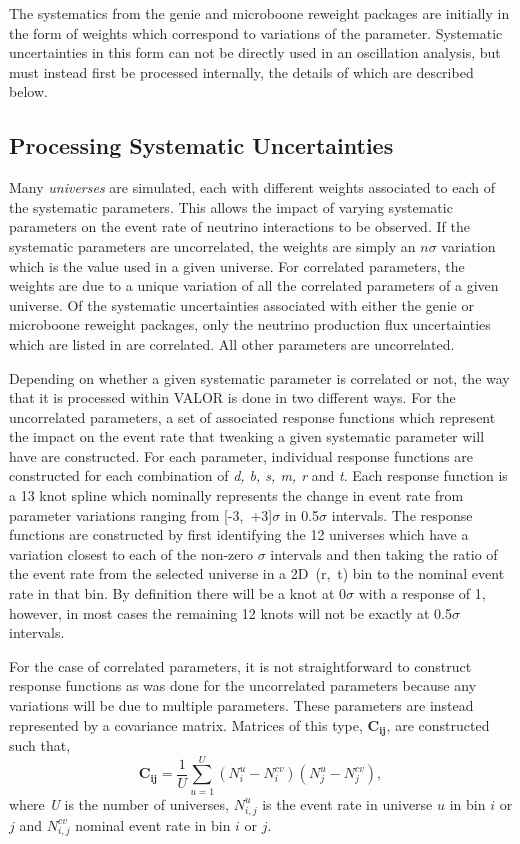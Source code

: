 The systematics from the \gls{genie} and \gls{microboone} reweight packages are initially in the form of weights which correspond to variations of the parameter. Systematic uncertainties in this form can not be directly used in an oscillation analysis, but must instead first be processed internally, the details of which are described below.

\subsection{Processing Systematic Uncertainties}\label{sec:systematic_validation}

Many \textit{universes} are simulated, each with different weights associated to each of the systematic parameters. This allows the impact of varying systematic parameters on the event rate of neutrino interactions to be observed. If the systematic parameters are uncorrelated, the weights are simply an $n \sigma$ variation which is the value used in a given universe. For correlated parameters, the weights are due to a unique variation of all the correlated parameters of a given universe. Of the systematic uncertainties associated with either the \gls{genie} or \gls{microboone} reweight packages, only the neutrino production flux uncertainties which are listed in  are correlated. All other parameters are uncorrelated. 

Depending on whether a given systematic parameter is correlated or not, the way that it is processed within VALOR is done in two different ways. For the uncorrelated parameters, a set of associated response functions which represent the impact on the event rate that tweaking a given systematic parameter will have are constructed. For each parameter, individual response functions are constructed for each combination of \textit{d, b, s, m, r} and \textit{t}. Each response function is a 13 knot spline which nominally represents the change in event rate from parameter variations ranging from \mbox{[-3, +3]$\sigma$} in 0.5$\sigma$ intervals. The response functions are constructed by first identifying the 12 universes which have a variation closest to each of the non-zero $\sigma$ intervals and then taking the ratio of the event rate from the selected universe in a \mbox{2D (r, t)} bin to the nominal event rate in that bin. By definition there will be a knot at 0$\sigma$ with a response of 1, however, in most cases the remaining 12 knots will not be exactly at 0.5$\sigma$ intervals. 

For the case of correlated parameters, it is not straightforward to construct response functions as was done for the uncorrelated parameters because any variations will be due to multiple parameters. These parameters are instead represented by a covariance matrix. Matrices of this type, $\mathbf{C_{ij}}$, are constructed such that,
\begin{equation}
  \mathbf{C_{ij}} = \frac{1}{U} \sum_{u=1}^{U} (N_{i}^{u}-N_{i}^{cv})(N_{j}^{u}-N_{j}^{cv}),
  \label{eq:covmatrix}
\end{equation}
where \textit{U} is the number of universes, $N_{i,j}^{u}$ is the event rate in universe $u$ in bin $i$ or $j$ and $N_{i,j}^{cv}$ nominal event rate in
bin $i$ or $j$.

